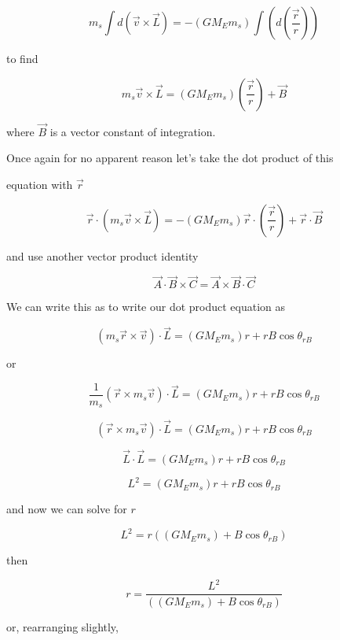 $$m_{s}\int d\left( \overrightarrow{v}\times \overrightarrow{L}\right)=-\left( GM_{E}m_{s}\right) \int \left( d\left( \frac{\overrightarrow{r}}{r}\right) \right)
$$

to find 

$$m_{s}\overrightarrow{v}\times \overrightarrow{L}=\left( GM_{E}m_{s}\right)\left( \frac{\overrightarrow{r}}{r}\right) +\overrightarrow{B}
$$

where $\overrightarrow{B}$ is a vector constant of integration.


Once again for no apparent reason let's take the dot product of this

equation with $\overrightarrow{r}$%

$$\overrightarrow{r}\cdot \left( m_{s}\overrightarrow{v}\times \overrightarrow{L}\right) =-\left( GM_{E}m_{s}\right) \overrightarrow{r}\cdot \left( \frac{\overrightarrow{r}}{r}\right) +\overrightarrow{r}\cdot \overrightarrow{B} 
$$

and use another vector product identity%

$$\overrightarrow{A}\cdot \overrightarrow{B}\times \overrightarrow{C}=\overrightarrow{A}\times \overrightarrow{B}\cdot \overrightarrow{C} 
$$

We can write this as to write our dot product equation as 

$$\left( m_{s}\overrightarrow{r}\times \overrightarrow{v}\right) \cdot \overrightarrow{L}=\left( GM_{E}m_{s}\right) r+rB\cos \theta _{rB} 
$$

or

$$\frac{1}{m_{s}}\left( \overrightarrow{r}\times m_{s}\overrightarrow{v}\right) \cdot \overrightarrow{L}=\left( GM_{E}m_{s}\right) r+rB\cos \theta_{rB}
$$

$$\left( \overrightarrow{r}\times m_{s}\overrightarrow{v}\right) \cdot \overrightarrow{L}=\left( GM_{E}m_{s}\right) r+rB\cos \theta _{rB} 
$$

$$\overrightarrow{L}\cdot \overrightarrow{L}=\left( GM_{E}m_{s}\right)r+rB\cos \theta _{rB} 
$$

$$L^{2}=\left( GM_{E}m_{s}\right) r+rB\cos \theta _{rB} 
$$

and now we can solve for $r$%

$$L^{2}=r\left( \left( GM_{E}m_{s}\right) +B\cos \theta _{rB}\right) 
$$

then 

$$r=\frac{L^{2}}{\left( \left( GM_{E}m_{s}\right) +B\cos \theta _{rB}\right) } 
$$

or, rearranging slightly, 

